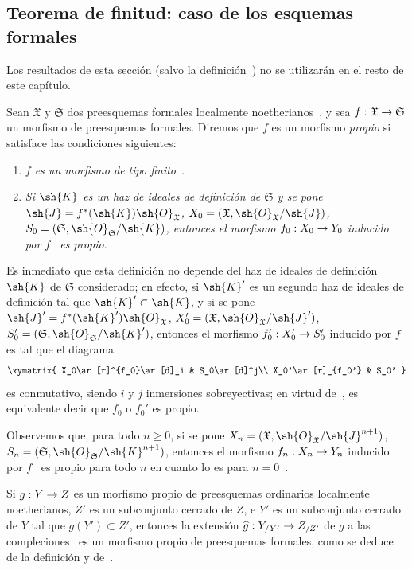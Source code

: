 \documentclass[oneside]{amsart}
\makeatletter
\renewcommand{\geq}{\geqslant}
\newcommand{\ega@arrow}[2]{\mathchoice{#1}{#2}{#2}{#2}}
\renewcommand{\to}{\ega@arrow{\longrightarrow}{\rightarrow}}
\newcommand{\oldpage}[2][]{{\marginnote{\normalfont\textbf{#1}~|~#2}}\ignorespaces}
\let\EGAOriginalLabel\label
\renewcommand{\label}[1]{\phantomsection\EGAOriginalLabel{#1}}
\makeatother
\begin{document}
\subsection{Teorema de finitud: caso de los esquemas formales}
\label{subsection:III.3.4}

\oldpage[III]{119}
Los resultados de esta sección (salvo la definición~) no se utilizarán en el resto de este capítulo.

\begin{env}[3.4.1]
\label{III.3.4.1}
Sean $\mathfrak{X}$ y $\mathfrak{S}$ dos preesquemas formales localmente noetherianos~, y sea $f:\mathfrak{X}\to\mathfrak{S}$ un morfismo de preesquemas formales.
Diremos que $f$ es un morfismo \emph{propio} si satisface las condiciones siguientes:
\begin{enumerate}
  \item[1.º] \emph{$f$ es un morfismo de tipo finito~}.
  \item[2.º] \emph{Si $\sh{K}$ es un haz de ideales de definición de $\mathfrak{S}$ y se pone $\sh{J}=f^*(\sh{K})\sh{O}_\mathfrak{X}$, $X_0=(\mathfrak{X},\sh{O}_\mathfrak{X}/\sh{J})$, $S_0=(\mathfrak{S},\sh{O}_\mathfrak{S}/\sh{K})$, entonces el morfismo $f_0:X_0\to Y_0$ inducido por $f$~ es propio}.
\end{enumerate}
Es inmediato que esta definición no depende del haz de ideales de definición $\sh{K}$ de $\mathfrak{S}$ considerado; en efecto, si $\sh{K}'$ es un segundo haz de ideales de definición tal que $\sh{K}'\subset\sh{K}$, y si se pone $\sh{J}'=f^*(\sh{K}')\sh{O}_\mathfrak{X}$, $X_0'=(\mathfrak{X},\sh{O}_\mathfrak{X}/\sh{J}')$, $S_0'=(\mathfrak{S},\sh{O}_\mathfrak{S}/\sh{K}')$, entonces el morfismo $f_0':X_0'\to S_0'$ inducido por $f$ es tal que el diagrama
\[
  \xymatrix{
    X_0\ar[r]^{f_0}\ar[d]_i &
    S_0\ar[d]^j\\
    X_0'\ar[r]_{f_0'} &
    S_0'
  }
\]
es conmutativo, siendo $i$ y $j$ inmersiones sobreyectivas; en virtud de~, es equivalente decir que $f_0$ o $f_0'$ es propio.

Observemos que, para todo $n\geq 0$, si se pone $X_n=(\mathfrak{X},\sh{O}_\mathfrak{X}/\sh{J}^{n+1})$, $S_n=(\mathfrak{S},\sh{O}_\mathfrak{S}/\sh{K}^{n+1})$, entonces el morfismo $f_n:X_n\to Y_n$ inducido por $f$~ es propio para todo $n$ en cuanto lo es para $n=0$~.

Si $g:Y\to Z$ es un morfismo propio de preesquemas ordinarios localmente noetherianos, $Z'$ es un subconjunto cerrado de $Z$, e $Y'$ es un subconjunto cerrado de $Y$ tal que $g(Y')\subset Z'$, entonces la extensión $\widehat{g}:Y_{/Y'}\to Z_{/Z'}$ de $g$ a las compleciones~ es un morfismo propio de preesquemas formales, como se deduce de la definición y de~.


\end{env}
\end{document}
